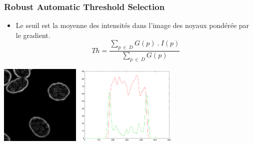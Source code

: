 \documentclass{beamer}
\begin{document}
    \frame
    {
      \frametitle{Robust Automatic Threshold Selection}
      \begin{itemize}
        \item<1->{Le seuil est la moyenne des intensités dans l'image des noyaux pondérée par le gradient.}
        $$
        Th = \frac{\sum\limits_{p~\in~D}G(p)~.~I(p)}{\sum\limits_{p~\in~D}G(p)}
        $$
      \end{itemize}
      \begin{center}
        \includegraphics[height=3.8cm]{noyaux-gradient.png}
        ~\includegraphics[height=3.75cm]{profile-gradient.png}
      \end{center}
    }
  
\end{document}
